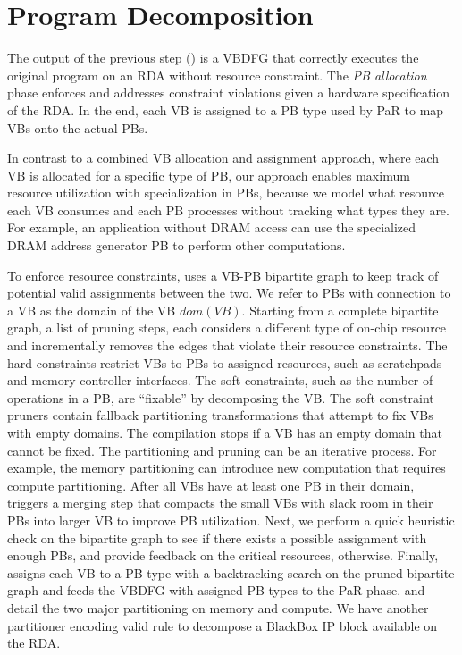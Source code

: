 \section{Program Decomposition} \label{sec:decompose}
The output of the previous step () is a VBDFG that correctly executes the original program on an RDA without resource constraint. 
The {\em PB allocation} phase enforces and addresses constraint violations given a hardware specification of the RDA. 
In the end, each VB is assigned to a PB type used by PaR to map VBs onto the actual PBs.

In contrast to a combined VB allocation and assignment approach, where each VB is allocated for a specific type of PB, our approach enables maximum resource utilization with specialization in PBs, because we model what resource each VB consumes and each PB processes without tracking what types they are.
For example, an application without DRAM access can use the specialized DRAM address generator PB to perform other computations.

To enforce resource constraints, \name{} uses a VB-PB bipartite graph to keep track of potential valid assignments between the two.
We refer to PBs with connection to a VB as the domain of the VB $dom(VB)$.
Starting from a complete bipartite graph, a list of pruning steps, each considers a different type of on-chip resource and incrementally removes the edges that violate their resource constraints.
The hard constraints restrict VBs to PBs to assigned resources, such as scratchpads and memory controller interfaces.
The soft constraints, such as the number of operations in a PB, are ``fixable'' by decomposing the VB.
The soft constraint pruners contain fallback partitioning transformations that attempt to fix VBs with empty domains.
The compilation stops if a VB has an empty domain that cannot be fixed.
The partitioning and pruning can be an iterative process. 
For example, the memory partitioning can introduce new computation that requires compute partitioning.
After all VBs have at least one PB in their domain, \name{} triggers a merging step that compacts the small VBs with slack room in their PBs into larger VB to improve PB utilization.
Next, we perform a quick heuristic check on the bipartite graph to see if there exists a possible assignment with enough PBs, and provide feedback on the critical resources, otherwise.
Finally, \name{} assigns each VB to a PB type with a backtracking search on the pruned bipartite graph and feeds the VBDFG with assigned PB types to the PaR phase.
 and  detail the two major partitioning on memory and compute.
We have another partitioner encoding valid rule to decompose a BlackBox IP block available on the RDA.


